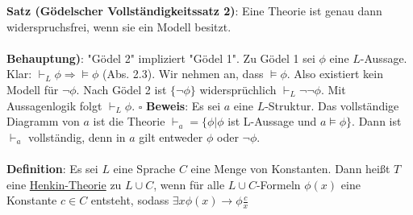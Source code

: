 \documentclass[a4paper]{scrartcl}
\begin{document}
\textbf{Satz (Gödelscher Vollständigkeitssatz 2)}: Eine Theorie ist genau dann widerspruchsfrei, wenn sie ein Modell besitzt.\\\\
\textbf{Behauptung)}: "Gödel 2" impliziert "Gödel 1". Zu Gödel 1 sei $\phi$ eine $L$-Aussage. Klar: $\vdash_L \phi \Rightarrow \models \phi$ (Abs. 2.3). Wir nehmen an, dass $\models \phi$. Also existiert kein Modell für $\neg \phi$. Nach Gödel 2 ist $\{ \neg \phi \}$ widersprüchlich $\vdash_L \neg \neg \phi$. Mit Aussagenlogik folgt $\vdash_L \phi$. $\square$
\textbf{Beweis}: Es sei $a$ eine $L$-Struktur. Das vollständige Diagramm von $a$ ist die Theorie $\vdash_a = \{ \phi | \phi$ ist L-Aussage und $a \models \phi \}$. Dann ist $\vdash_a$ vollständig, denn in $a$ gilt entweder $\phi$ oder $\neg \phi$.\\\\
\textbf{Definition}: Es sei $L$ eine Sprache $C$ eine Menge von Konstanten. Dann heißt $T$ eine \underline{Henkin-Theorie} zu $L \cup C$, wenn für alle $L \cup C$-Formeln $\phi(x)$ eine Konstante $c \in C$ entsteht, sodass $\exists x \phi(x) \rightarrow \phi \frac {c}{x}$
\end{document}
